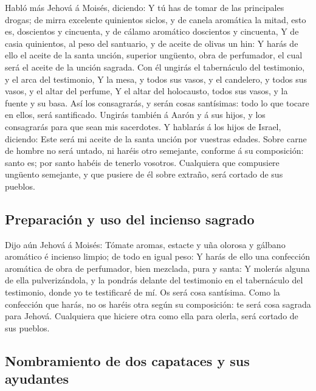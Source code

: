  Habló más Jehová á Moisés, diciendo:  Y tú
has de tomar de las principales drogas; de mirra excelente quinientos
siclos, y de canela aromática la mitad, esto es, doscientos y cincuenta,
y de cálamo aromático doscientos y cincuenta,  Y de casia
quinientos, al peso del santuario, y de aceite de olivas un hin:
 Y harás de ello el aceite de la santa unción, superior
ungüento, obra de perfumador, el cual será el aceite de la unción
sagrada.  Con él ungirás el tabernáculo del testimonio, y
el arca del testimonio,  Y la mesa, y todos sus vasos, y el
candelero, y todos sus vasos, y el altar del perfume,  Y el
altar del holocausto, todos sus vasos, y la fuente y su basa.
 Así los consagrarás, y serán cosas santísimas: todo lo que
tocare en ellos, será santificado.  Ungirás también á Aarón
y á sus hijos, y los consagrarás para que sean mis sacerdotes.
 Y hablarás á los hijos de Israel, diciendo: Este será mi
aceite de la santa unción por vuestras edades.  Sobre carne
de hombre no será untado, ni haréis otro semejante, conforme á su
composición: santo es; por santo habéis de tenerlo vosotros.
 Cualquiera que compusiere ungüento semejante, y que
pusiere de él sobre extraño, será cortado de sus pueblos.

\hypertarget{preparaciuxf3n-y-uso-del-incienso-sagrado}{%
\subsection{Preparación y uso del incienso
sagrado}\label{preparaciuxf3n-y-uso-del-incienso-sagrado}}

 Dijo aún Jehová á Moisés: Tómate aromas, estacte y uña
olorosa y gálbano aromático é incienso limpio; de todo en igual peso:
 Y harás de ello una confección aromática de obra de
perfumador, bien mezclada, pura y santa:  Y molerás alguna
de ella pulverizándola, y la pondrás delante del testimonio en el
tabernáculo del testimonio, donde yo te testificaré de mí. Os será cosa
santísima.  Como la confección que harás, no os haréis otra
según su composición: te será cosa sagrada para Jehová. 
Cualquiera que hiciere otra como ella para olerla, será cortado de sus
pueblos.

\hypertarget{nombramiento-de-dos-capataces-y-sus-ayudantes}{%
\subsection{Nombramiento de dos capataces y sus
ayudantes}\label{nombramiento-de-dos-capataces-y-sus-ayudantes}}


